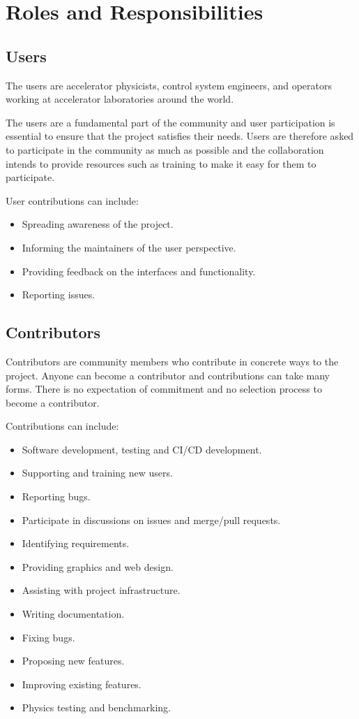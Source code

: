 \documentclass{article}
\begin{document}
\section{Roles and Responsibilities}

\subsection{Users}

The users are accelerator physicists, control system engineers, and operators working at accelerator laboratories around the world.

The users are a fundamental part of the community and user participation is essential to ensure that the project satisfies their needs. Users are therefore asked to participate in the community as much as possible and the collaboration intends to provide resources such as training to make it easy for them to participate.

User contributions can include:

\begin{itemize}
    \item Spreading awareness of the project.
    \item Informing the maintainers of the user perspective.
    \item Providing feedback on the interfaces and functionality.
    \item Reporting issues.
\end{itemize}

\subsection{Contributors}
\label{contributors}
Contributors are community members who contribute in concrete ways to the project. Anyone can become a contributor and contributions can take many forms. There is no expectation of commitment and no selection process to become a contributor.

Contributions can include:

\begin{itemize}
    \item Software development, testing and CI/CD development.
    \item Supporting and training new users.
    \item Reporting bugs.
    \item Participate in discussions on issues and merge/pull requests.
    \item Identifying requirements.
    \item Providing graphics and web design.
    \item Assisting with project infrastructure.
    \item Writing documentation.
    \item Fixing bugs.
    \item Proposing new features.
    \item Improving existing features.
    \item Physics testing and benchmarking.
\end{itemize}
\end{document}
